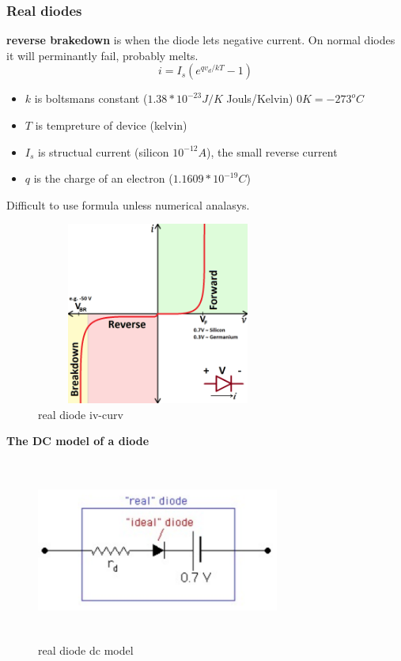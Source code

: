 \subsubsection{Real diodes}
\textbf{reverse brakedown} is when the diode lets negative current. 
On normal diodes it will perminantly fail, probably melts.
\begin{equation}
  i=I_s(e^{qv_d/kT}-1)
\end{equation}
\begin{itemize}
  \item  $k$ is boltsmans constant ($1.38*10^{-23}J/K$ Jouls/Kelvin) $0K=-273^oC$
  \item  $T$ is tempreture of device (kelvin)
  \item  $I_s$ is structual current (silicon $10^{-12}A$), the small reverse current
  \item  $q$ is the charge of an electron ($1.1609*10^{-19}C$)
\end{itemize}

Difficult to use formula unless numerical analasys.

\begin{figure}[h]
    \centering
    \includegraphics[width=8cm, height=6cm]{image/real-diode.png}
    \caption{real diode iv-curv}
\end{figure}

\newpage
\textbf{The DC model of a diode}
\begin{figure}[h]
    \centering
    \includegraphics[width=8cm, height=6cm]{image/real_diode_dc.png}
    \caption{real diode dc model}
\end{figure}


